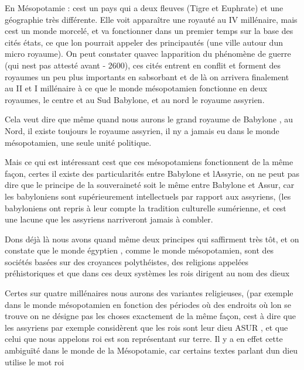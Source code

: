 \documentclass{article}
\begin{document}
En Mésopotamie : c{\textquotesingle}est un pays qui a deux fleuves
(Tigre et Euphrate) et une géographie très différente. Elle voit
apparaître une royauté au IV millénaire, mais c{\textquotesingle}est un
monde morcelé, et va fonctionner dans un premier temps sur la base des
cités états, ce que l{\textquotesingle}on pourrait appeler des
principautés (une ville autour d{\textquotesingle}un micro royaume). On
peut constater qu{\textquotesingle}avec l{\textquotesingle}apparition
du phénomène de guerre (qui n{\textquotesingle}est pas attesté avant -
2600), ces cités entrent en conflit et forment des royaumes un peu plus
importants en s{\textquotesingle}absorbant et de là on arrivera
finalement au II et I millénaire à ce que le monde mésopotamien
fonctionne en deux royaumes, le centre et au Sud  Babylone, et au nord
le royaume assyrien.

Cela veut dire que même quand nous aurons le grand royaume de Babylone ,
au Nord,  il existe toujours le royaume assyrien, il
n{\textquotesingle}y a jamais eu dans le monde mésopotamien, une seule
unité politique.

Mais ce qui est intéressant c{\textquotesingle}est que ces mésopotamiens
fonctionnent de la même façon, certes il existe des particularités
entre Babylone et l{\textquotesingle}Assyrie, on ne peut pas dire que
le principe de la souveraineté soit le même  entre Babylone et Assur,
car les babyloniens sont supérieurement intellectuels par rapport aux
assyriens, (les babyloniens ont repris à leur compte la tradition
culturelle sumérienne, et c{\textquotesingle}est une lacune que les
assyriens n{\textquotesingle}arriveront jamais à combler.

Dons déjà là nous avons quand même deux principes qui
s{\textquotesingle}affirment très tôt, et on constate que le monde
égyptien , comme le monde mésopotamien, sont des sociétés basées sur
des croyances polythéistes, des religions appelées préhistoriques et
que dans ces deux systèmes  les rois dirigent au nom des dieux

Certes sur quatre millénaires nous aurons des variantes religieuses,
(par exemple dans le monde mésopotamien en fonction des périodes où des
endroits où l{\textquotesingle}on se trouve on ne désigne pas les
choses exactement de la même façon, c{\textquotesingle}est à dire que
les assyriens par exemple considèrent que les rois sont leur dieu ASUR
, et que celui que nous appelons roi est son représentant sur terre. 
Il y a en effet cette ambiguïté dans le monde de la Mésopotamie, car
certains textes parlant d{\textquotesingle}un dieu utilise le mot roi
\end{document}
